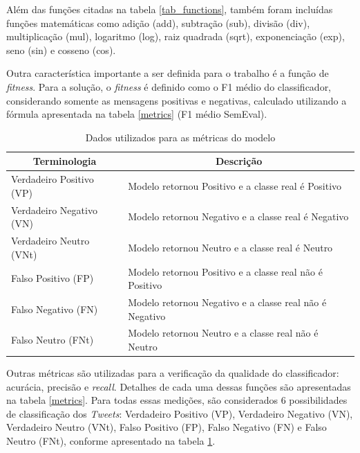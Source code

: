 \documentclass[12pt]{article}
\begin{document}
Além das funções citadas na tabela \ref{tab_functions}, também foram incluídas funções matemáticas como adição (add), subtração (sub), divisão (div), multiplicação (mul), logaritmo (log), raiz quadrada (sqrt), exponenciação (exp), seno (sin) e cosseno (cos).

Outra característica importante a ser definida para o trabalho é a função de \emph{fitness}. Para a solução, o \emph{fitness} é definido como o F1 médio do classificador, considerando somente as mensagens positivas e negativas, calculado utilizando a fórmula apresentada na tabela \ref{metrics} (F1 médio SemEval).

\begin{table}[H]
\centering
	\begin{tabular}{ll}
	\multicolumn{1}{c}{\textbf{Terminologia}} & \multicolumn{1}{c}{\textbf{Descrição}} \\ \hline
	Verdadeiro Positivo (VP) & Modelo retornou Positivo e a classe real é Positivo \\ \hline
	Verdadeiro Negativo (VN) & Modelo retornou Negativo e a classe real é Negativo \\ \hline
	Verdadeiro Neutro (VNt) & Modelo retornou Neutro e a classe real é Neutro \\ \hline
	Falso Positivo (FP) & Modelo retornou Positivo e a classe real não é Positivo \\ \hline
	Falso Negativo (FN) & Modelo retornou Negativo e a classe real não é Negativo \\ \hline
	Falso Neutro (FNt) & Modelo retornou Neutro e a classe real não é Neutro \\ \hline
	\end{tabular}
	\caption{Dados utilizados para as métricas do modelo}
	\label{metricsTrueFalse}
\end{table}

Outras métricas são utilizadas para a verificação da qualidade do classificador: acurácia, precisão e \emph{recall}. Detalhes de cada uma dessas funções são apresentadas na tabela \ref{metrics}. Para todas essas medições, são considerados 6 possibilidades de classificação dos \emph{Tweets}: Verdadeiro Positivo (VP), Verdadeiro Negativo (VN), Verdadeiro Neutro (VNt), Falso Positivo (FP), Falso Negativo (FN) e Falso Neutro (FNt), conforme apresentado na tabela \ref{metricsTrueFalse}.
\end{document}
